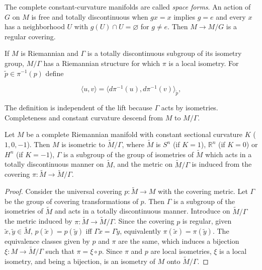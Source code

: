The complete constant-curvature manifolds are called \emph{space forms}. An action
of $G$ on $M$ is free and totally discontinuous when $gx=x$ implies $g=e$ and every
$x$ has a neighborhood $U$ with $g(U)\cap U=\varnothing$ for $g\ne e$. Then
$M\to M/G$ is a regular covering.

If $M$ is Riemannian and $\Gamma$ is a totally discontinuous subgroup of its
isometry group, $M/\Gamma$ has a Riemannian structure for which $\pi$ is a local
isometry. For $\tilde p\in\pi^{-1}(p)$ define

$$
\langle u,v\rangle=\langle d\pi^{-1}(u),d\pi^{-1}(v)\rangle_{\tilde{p}},
$$

The definition is independent of the lift because $\Gamma$ acts by isometries.
Completeness and constant curvature descend from $M$ to $M/\Gamma$.

\begin{proposition}
  \label{prop:dc-ch8-4-3}
  \notready
  Let $M$ be a complete Riemannian manifold with constant sectional curvature $K$
  ($1,0,-1$). Then $M$ is isometric to $\tilde{M}/\Gamma$, where $\tilde{M}$ is $S^n$
  (if $K=1$), $\mathbb{R}^n$ (if $K=0$) or $H^n$ (if $K=-1$), $\Gamma$ is a subgroup
  of the group of isometries of $\tilde{M}$ which acts in a totally discontinuous
  manner on $\tilde{M}$, and the metric on $\tilde{M}/\Gamma$ is induced from the
  covering $\pi:\tilde{M}\to\tilde{M}/\Gamma$.
\end{proposition}
\begin{proof}
\sketch
  Consider the universal covering $p:\tilde{M}\to M$ with the covering
  metric. Let $\Gamma$ be the group of covering transformations of $p$. Then
  $\Gamma$ is a subgroup of the isometries of $\tilde{M}$ and acts in a totally
  discontinuous manner. Introduce on $\tilde{M}/\Gamma$ the metric induced by
  $\pi:\tilde{M}\to\tilde{M}/\Gamma$. Since the covering $p$ is regular, given
  $\tilde{x},\tilde{y}\in\tilde{M}$, $p(\tilde{x})=p(\tilde{y})$ iff
  $\Gamma\tilde{x}=\Gamma\tilde{y}$, equivalently $\pi(\tilde{x})=\pi(\tilde{y})$.
  The equivalence classes given by $p$ and $\pi$ are the same, which induces a
  bijection $\xi:M\to\tilde{M}/\Gamma$ such that $\pi=\xi\circ p$. Since $\pi$ and
  $p$ are local isometries, $\xi$ is a local isometry, and being a bijection, is an
  isometry of $M$ onto $\tilde{M}/\Gamma$.
\end{proof}

